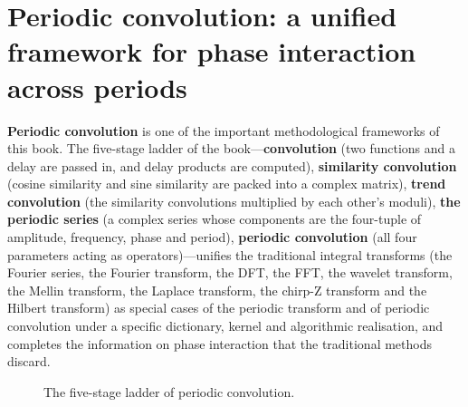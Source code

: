 \section{Periodic convolution: a unified framework for phase interaction across periods}

\textbf{Periodic convolution} is one of the important methodological frameworks of this book. The five-stage ladder of the book---\textbf{convolution} (two functions and a delay are passed in, and delay products are computed), \textbf{similarity convolution} (cosine similarity and sine similarity are packed into a complex matrix), \textbf{trend convolution} (the similarity convolutions multiplied by each other's moduli), \textbf{the periodic series} (a complex series whose components are the four-tuple of amplitude, frequency, phase and period), \textbf{periodic convolution} (all four parameters acting as operators)---unifies the traditional integral transforms (the Fourier series, the Fourier transform, the DFT, the FFT, the wavelet transform, the Mellin transform, the Laplace transform, the chirp-Z transform and the Hilbert transform) as special cases of the periodic transform and of periodic convolution under a specific dictionary, kernel and algorithmic realisation, and completes the information on phase interaction that the traditional methods discard.

\begin{figure}[htbp]
\centering
{}
\caption{The five-stage ladder of periodic convolution.}
\label{fig:closing_convolution_ladder}
\end{figure}

